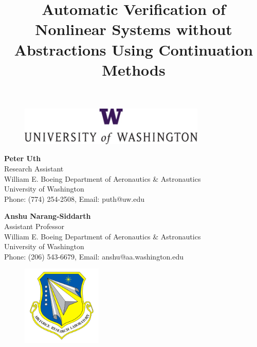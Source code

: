 \documentclass[12pt]{article}
\begin{document}
\title{Automatic Verification of Nonlinear Systems without Abstractions Using Continuation Methods}
\date{}
\author{}
\maketitle

\begin{figure}[h]
\begin{center}
\includegraphics[width=3.5in]{uw_logo.png}
\end{center}
\vspace{-0.25in}
\end{figure}

\begin{center}
\textbf{Peter Uth}\\Research Assistant\\William E. Boeing Department of Aeronautics \& Astronautics\\University of Washington\\Phone: (774) 254-2508, Email: puth@uw.edu
\end{center}

\begin{center}
\textbf{Anshu Narang-Siddarth}\\Assistant Professor\\William E. Boeing Department of Aeronautics \& Astronautics\\University of Washington\\Phone: (206) 543-6679, Email: anshu@aa.washington.edu
\end{center}

\vspace{0.5in}

\begin{figure}[h]
\begin{center}
\includegraphics[width=1.5in]{afrl_logo.png}
\end{center}
\vspace{-0.25in}
\end{figure}
\end{document}
